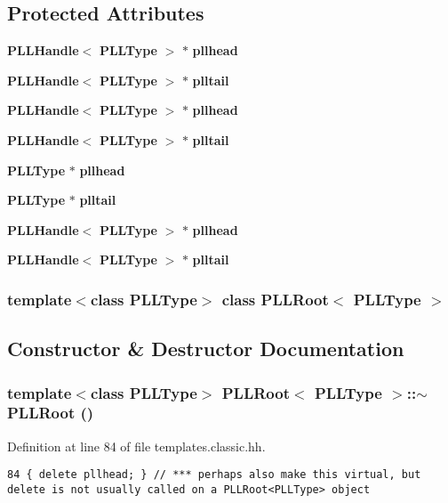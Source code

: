 \subsection*{Protected Attributes}
\begin{CompactItemize}
\item 
{\bf PLLHandle}$<$ {\bf PLLType} $>$ $\ast$ {\bf pllhead}
\item 
{\bf PLLHandle}$<$ {\bf PLLType} $>$ $\ast$ {\bf plltail}
\item 
{\bf PLLHandle}$<$ {\bf PLLType} $>$ $\ast$ {\bf pllhead}
\item 
{\bf PLLHandle}$<$ {\bf PLLType} $>$ $\ast$ {\bf plltail}
\item 
{\bf PLLType} $\ast$ {\bf pllhead}
\item 
{\bf PLLType} $\ast$ {\bf plltail}
\item 
{\bf PLLHandle}$<$ {\bf PLLType} $>$ $\ast$ {\bf pllhead}
\item 
{\bf PLLHandle}$<$ {\bf PLLType} $>$ $\ast$ {\bf plltail}
\end{CompactItemize}
\subsubsection*{template$<$class PLLType$>$ class PLLRoot$<$ PLLType $>$}



\subsection{Constructor \& Destructor Documentation}
\subsubsection{\setlength{\rightskip}{0pt plus 5cm}template$<$class PLLType$>$ PLLRoot$<$ {\bf PLLType} $>$::$\sim$PLLRoot ()\hspace{0.3cm}{\tt  [inline]}}\label{classPLLRoot_a0}




Definition at line 84 of file templates.classic.hh.



\footnotesize\begin{verbatim}84 { delete pllhead; } // *** perhaps also make this virtual, but delete is not usually called on a PLLRoot<PLLType> object
\end{verbatim}\normalsize 
{}
